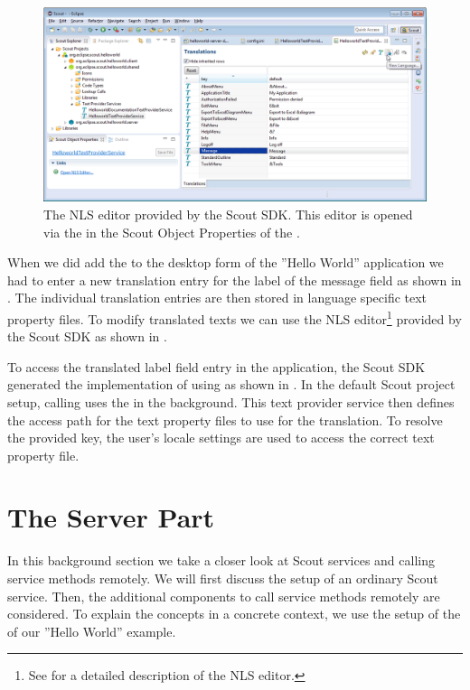 \documentclass[a4paper,10pt,twoside]{book}
\begin{document}
\begin{figure}
\includegraphics[width=14cm]{sdk_nls_editor.png} 
\caption{The NLS editor provided by the Scout SDK. This editor is opened via the  in the Scout Object Properties of the .
}
\end{figure}

When we did add the  to the desktop form of the ''Hello World'' application we had to enter a new translation entry for the label of the message field as shown in .
The individual translation entries are then stored in language specific text property files.
To modify translated texts we can use the NLS editor\footnote{
See  for a detailed description of the NLS editor.
} 
provided by the Scout SDK as shown in .

To access the translated label field entry in the application, the Scout SDK generated the implementation of  using  as shown in .
In the default Scout project setup, calling  uses the  in the background.
This text provider service then defines the access path for the text property files to use for the translation.
To resolve the provided key, the user's locale settings are used to access the correct text property file.

\section{The Server Part}

In this background section we take a closer look at Scout services and calling service methods remotely.
We will first discuss the setup of an ordinary Scout service.
Then, the additional components to call service methods remotely are considered.
To explain the concepts in a concrete context, we use the setup of the  of our ''Hello World'' example.
\end{document}
